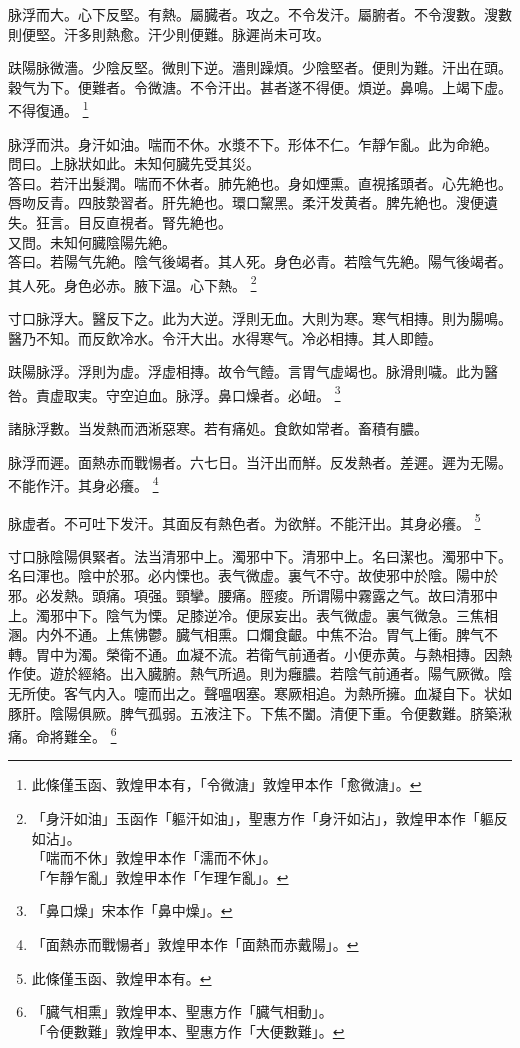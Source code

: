 \documentclass[12pt,oneside,UTF8,b5paper]{ctexbook}她她她她她她她
\begin{document}
脉浮而大。心下反堅。有熱。屬臓者。攻之。不令发汗。屬腑者。不令溲數。溲數則便堅。汗多則熱愈。汗少則便難。脉遲尚未可攻。

趺陽脉微濇。少陰反堅。微則下逆。濇則躁煩。少陰堅者。便則为難。汗出在頭。穀气为下。便難者。令微溏。不令汗出。甚者遂不得便。煩逆。鼻鳴。上竭下虚。不得復通。
	\footnote{此條僅玉函、敦煌甲本有，「令微溏」敦煌甲本作「愈微溏」。}

脉浮而洪。身汗如油。喘而不休。水漿不下。形体不仁。乍靜乍亂。此为命絶。\\
問曰。上脉狀如此。未知何臓先受其災。\\
答曰。若汗出髮潤。喘而不休者。肺先絶也。身如煙熏。直視搖頭者。心先絶也。唇吻反青。四肢漐習者。肝先絶也。環口黧黑。柔汗发黄者。脾先絶也。溲便遺失。狂言。目反直視者。腎先絶也。\\
又問。未知何臓陰陽先絶。\\
答曰。若陽气先絶。陰气後竭者。其人死。身色必青。若陰气先絶。陽气後竭者。其人死。身色必赤。腋下温。心下熱。
	\footnote{「身汗如油」玉函作「軀汗如油」，聖惠方作「身汗如沾」，敦煌甲本作「軀反如沾」。\\「喘而不休」敦煌甲本作「濡而不休」。\\「乍靜乍亂」敦煌甲本作「乍理乍亂」。}

寸口脉浮大。醫反下之。此为大逆。浮則无血。大則为寒。寒气相摶。則为腸鳴。醫乃不知。而反飲冷水。令汗大出。水得寒气。冷必相摶。其人即饐。

趺陽脉浮。浮則为虚。浮虚相摶。故令气饐。言胃气虚竭也。脉滑則噦。此为醫咎。責虚取実。守空迫血。脉浮。鼻口燥者。必衄。
	\footnote{「鼻口燥」宋本作「鼻中燥」。}

諸脉浮數。当发熱而洒淅惡寒。若有痛処。食飲如常者。畜積有膿。

脉浮而遲。面熱赤而戰愓者。六七日。当汗出而觧。反发熱者。差遲。遲为无陽。不能作汗。其身必癢。
	\footnote{「面熱赤而戰愓者」敦煌甲本作「面熱而赤戴陽」。}

脉虚者。不可吐下发汗。其面反有熱色者。为欲觧。不能汗出。其身必癢。
	\footnote{此條僅玉函、敦煌甲本有。}

寸口脉陰陽俱緊者。法当清邪中上。濁邪中下。清邪中上。名曰潔也。濁邪中下。名曰渾也。陰中於邪。必内慄也。表气微虚。裏气不守。故使邪中於陰。陽中於邪。必发熱。頭痛。項强。頸攣。腰痛。脛痠。所谓陽中霧露之气。故曰清邪中上。濁邪中下。陰气为慄。足膝逆冷。便尿妄出。表气微虚。裏气微急。三焦相溷。内外不通。上焦怫鬱。臓气相熏。口爛食齦。中焦不治。胃气上衝。脾气不轉。胃中为濁。榮衛不通。血凝不流。若衛气前通者。小便赤黄。与熱相摶。因熱作使。遊於經絡。出入臓腑。熱气所過。則为癰膿。若陰气前通者。陽气厥微。陰无所使。客气内入。嚏而出之。聲嗢咽塞。寒厥相追。为熱所擁。血凝自下。状如豚肝。陰陽俱厥。脾气孤弱。五液注下。下焦不闔。清便下重。令便數難。脐築湫痛。命將難全。
	\footnote{「臓气相熏」敦煌甲本、聖惠方作「臓气相動」。\\「令便數難」敦煌甲本、聖惠方作「大便數難」。}
\end{document}
